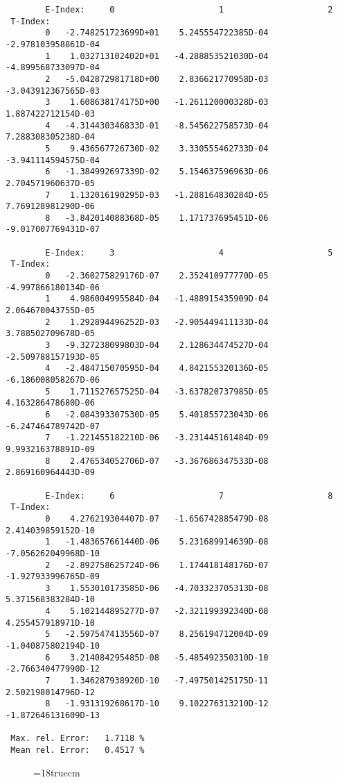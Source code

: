 \begin{verbatim}
        E-Index:     0                     1                     2
 T-Index:
        0   -2.748251723699D+01    5.245554722385D-04   -2.978103958861D-04
        1    1.032713102402D+01   -4.288853521030D-04   -4.899568733097D-04
        2   -5.042872981718D+00    2.836621770958D-03   -3.043912367565D-03
        3    1.608638174175D+00   -1.261120000328D-03    1.887422712154D-03
        4   -4.314430346833D-01   -8.545622758573D-04    7.288308305238D-04
        5    9.436567726730D-02    3.330555462733D-04   -3.941114594575D-04
        6   -1.384992697339D-02    5.154637596963D-06    2.704571960637D-05
        7    1.132016190295D-03   -1.288164830284D-05    7.769128981290D-06
        8   -3.842014088368D-05    1.171737695451D-06   -9.017007769431D-07

        E-Index:     3                     4                     5
 T-Index:
        0   -2.360275829176D-07    2.352410977770D-05   -4.997866180134D-06
        1    4.986004995584D-04   -1.488915435909D-04    2.064670043755D-05
        2    1.292894496252D-03   -2.905449411133D-04    3.788502709678D-05
        3   -9.327238099803D-04    2.128634474527D-04   -2.509788157193D-05
        4   -2.484715070595D-04    4.842155320136D-05   -6.186008058267D-06
        5    1.711527657525D-04   -3.637820737985D-05    4.163286478680D-06
        6   -2.084393307530D-05    5.401855723043D-06   -6.247464789742D-07
        7   -1.221455182210D-06   -3.231445161484D-09    9.993216378891D-09
        8    2.476534052706D-07   -3.367686347533D-08    2.869160964443D-09

        E-Index:     6                     7                     8
 T-Index:
        0    4.276219304407D-07   -1.656742885479D-08    2.414039859152D-10
        1   -1.483657661440D-06    5.231689914639D-08   -7.056262049968D-10
        2   -2.892758625724D-06    1.174418148176D-07   -1.927933996765D-09
        3    1.553010173585D-06   -4.703323705313D-08    5.371568383284D-10
        4    5.102144895277D-07   -2.321199392340D-08    4.255457918971D-10
        5   -2.597547413556D-07    8.256194712004D-09   -1.040875802194D-10
        6    3.214084295485D-08   -5.485492350310D-10   -2.766340477990D-12
        7    1.346287938920D-10   -7.497501425175D-11    2.502198014796D-12
        8   -1.931319268617D-10    9.102276313210D-12   -1.872646131609D-13

 Max. rel. Error:   1.7118 %
 Mean rel. Error:   0.4517 %

\end{verbatim}
\begin{figure} \label{2.2.5}
\epsfxsize=18truecm
\end{figure}
\newpage


